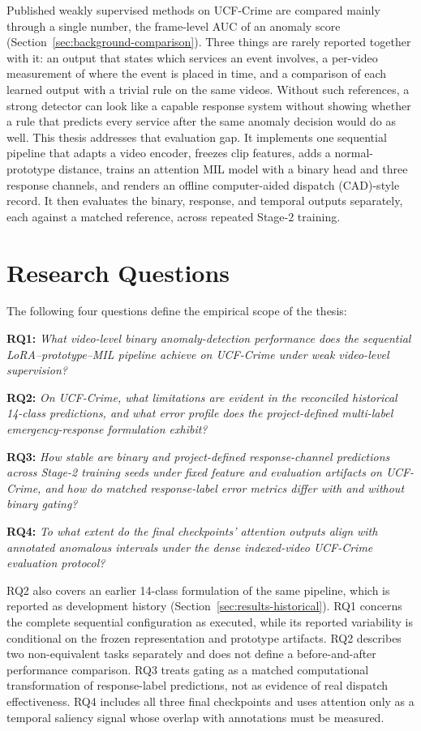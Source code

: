 Published weakly supervised methods on UCF-Crime are compared mainly through
a single number, the frame-level AUC of an anomaly score
(Section~\ref{sec:background-comparison}). Three things are rarely reported
together with it: an output that states which services an event involves, a
per-video measurement of where the event is placed in time, and a comparison
of each learned output with a trivial rule on the same videos. Without such
references, a strong detector can look like a capable response system without
showing whether a rule that predicts every service after the same anomaly
decision would do as well. This thesis addresses that evaluation gap. It implements one sequential
pipeline that adapts a video encoder, freezes clip features, adds a
normal-prototype distance, trains an attention MIL model with a binary head and
three response channels, and renders an offline computer-aided dispatch
(CAD)-style record. It then evaluates the binary, response, and temporal outputs
separately, each against a matched reference, across repeated Stage-2 training.

\section{Research Questions}
\label{sec:introduction-rqs}

The following four questions define the empirical scope of the thesis:

\noindent\textbf{RQ1:} \emph{What video-level binary anomaly-detection
performance does the sequential LoRA–\allowbreak prototype–\allowbreak MIL pipeline achieve on
UCF-Crime under weak video-level supervision?}

\noindent\textbf{RQ2:} \emph{On UCF-Crime, what limitations are evident in the
reconciled historical 14-class predictions, and what error profile does the
project-defined multi-label emergency-response formulation exhibit?}

\noindent\textbf{RQ3:} \emph{How stable are binary and project-defined
response-channel predictions across Stage-2 training seeds under fixed feature
and evaluation artifacts on UCF-Crime, and how do matched response-label error
metrics differ with and without binary gating?}

\noindent\textbf{RQ4:} \emph{To what extent do the final checkpoints’ attention
outputs align with annotated anomalous intervals under the dense indexed-video
UCF-Crime evaluation protocol?}

RQ2 also covers an earlier 14-class formulation of the same pipeline, which is
reported as development history (Section~\ref{sec:results-historical}). RQ1
concerns the complete sequential configuration as executed, while its
reported variability is conditional on the frozen representation and prototype
artifacts. RQ2 describes two non-equivalent tasks separately and does not define
a before-and-after performance comparison. RQ3 treats gating as a matched
computational transformation of response-label predictions, not as evidence of
real dispatch effectiveness. RQ4 includes all three final checkpoints and uses
attention only as a temporal saliency signal whose overlap with annotations must
be measured.

